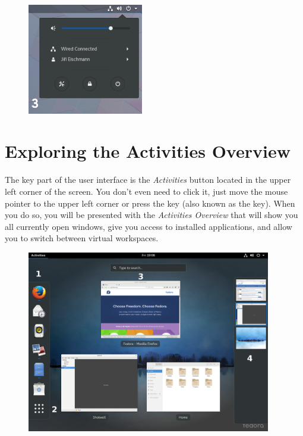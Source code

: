 \begin{enumerate}
\begin{figure}[htbp]
\begin{center}
\includegraphics[width=0.45\textwidth]{img/menu}
 \label{fig:menu}
\end{center}
\end{figure}

\end{enumerate}

\section*{Exploring the Activities Overview}

The key part of the user interface is the \emph{Activities} button located in the upper left corner of the screen. You don't even need to click it, just move the mouse pointer to the upper left corner or press the  key (also known as the  key). When you do so, you will be presented with the \emph{Activities Overview} that will show you all currently open windows, give you access to installed applications, and allow you to switch between virtual workspaces.

\begin{figure}[t]
\begin{center}
\includegraphics[width=0.95\textwidth]{img/shell-b}
 \label{fig:shell-b}
\end{center}
\end{figure}


